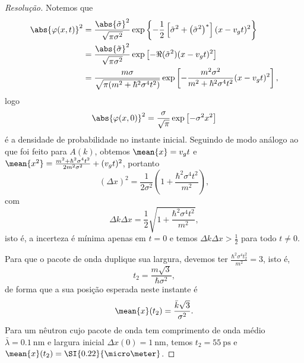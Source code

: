 \begin{proof}[Resolução]
    Notemos que
    \begin{align*}
        \abs{\varphi(x,t)}^2 &= \frac{\abs{\tilde{\sigma}}^2}{\sqrt{\pi \sigma^2}} \exp\left\{-\frac{1}{2}\left[\tilde{\sigma}^2 + \left(\tilde{\sigma}^2\right)^*\right](x - v_g t)^2\right\} \\
                             &= \frac{\abs{\tilde{\sigma}}^2}{\sqrt{\pi \sigma^2}} \exp\left[-\Re(\tilde{\sigma}^2)(x - v_gt)^2\right]\\
                             &= \frac{m \sigma}{\sqrt{\pi (m^2 + \hbar^2 \sigma^4 t^2)}} \exp\left[-\frac{m^2 \sigma^2}{m^2 + \hbar^2 \sigma^4 t^2}(x - v_g t)^2\right],
    \end{align*}
    logo
    \begin{equation*}
        \abs{\varphi(x,0)}^2 = \frac{\sigma}{\sqrt{\pi}}\exp\left[- \sigma^2 x^2\right]
    \end{equation*}
    é a densidade de probabilidade no instante inicial. Seguindo de modo análogo ao que foi feito para \(A(k)\), obtemos \(\mean{x} = v_g t\) e \(\mean{x^2} = \frac{m^2 + \hbar^2 \sigma^4 t^2}{2m^2 \sigma^2} + (v_g t)^2\), portanto
    \begin{equation*}
        (\Delta x)^2 = \frac{1}{2\sigma^2}\left(1 + \frac{\hbar^2 \sigma^4 t^2}{m^2}\right),
    \end{equation*}
    com
    \begin{equation*}
        \Delta k \Delta x = \frac12\sqrt{1 + \frac{\hbar ^2 \sigma^4 t^2}{m^2}},
    \end{equation*}
    isto é, a incerteza é mínima apenas em \(t = 0\) e temos \(\Delta k \Delta x > \frac12\) para todo \(t \neq 0\).

    Para que o pacote de onda duplique sua largura, devemos ter \(\frac{\hbar^2 \sigma^4 t_2^2}{m^2} = 3\), isto é,
    \begin{equation*}
        t_2 = \frac{m\sqrt{3}}{\hbar \sigma^2},
    \end{equation*}
    de forma que a sua posição esperada neste instante é
    \begin{equation*}
        \mean{x}(t_2) = \frac{\bar{k} \sqrt{3}}{\sigma^2}.
    \end{equation*}
    Para um nêutron cujo pacote de onda tem comprimento de onda médio \(\bar{\lambda} = \SI{0.1}{\nano\meter}\) e largura inicial \(\Delta x(0) = \SI{1}{\nano\meter}\), temos \(t_2 = \SI{55}{\pico\second}\) e \(\mean{x}(t_2) = \SI{0.22}{\micro\meter}\).
\end{proof}
